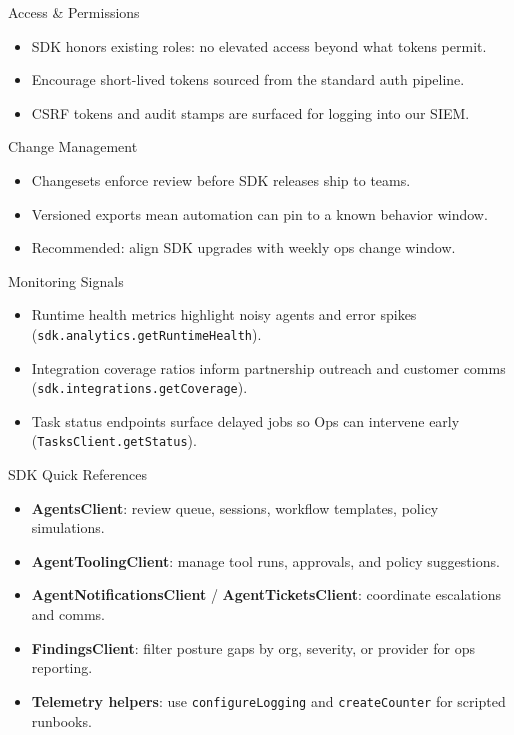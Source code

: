 \documentclass[aspectratio=169]{beamer}
\begin{document}
\begin{frame}{Access \& Permissions}
  \begin{itemize}
    \item SDK honors existing roles: no elevated access beyond what tokens permit.
    \item Encourage short-lived tokens sourced from the standard auth pipeline.
    \item CSRF tokens and audit stamps are surfaced for logging into our SIEM.
  \end{itemize}
\end{frame}

\begin{frame}{Change Management}
  \begin{itemize}
    \item Changesets enforce review before SDK releases ship to teams.
    \item Versioned exports mean automation can pin to a known behavior window.
    \item Recommended: align SDK upgrades with weekly ops change window.
  \end{itemize}
\end{frame}

\begin{frame}{Monitoring Signals}
  \begin{itemize}
    \item Runtime health metrics highlight noisy agents and error spikes (\texttt{sdk.analytics.getRuntimeHealth}).
    \item Integration coverage ratios inform partnership outreach and customer comms (\texttt{sdk.integrations.getCoverage}).
    \item Task status endpoints surface delayed jobs so Ops can intervene early (\texttt{TasksClient.getStatus}).
  \end{itemize}
\end{frame}

\begin{frame}{SDK Quick References}
  \begin{itemize}
    \item \textbf{AgentsClient}: review queue, sessions, workflow templates, policy simulations.
    \item \textbf{AgentToolingClient}: manage tool runs, approvals, and policy suggestions.
    \item \textbf{AgentNotificationsClient} / \textbf{AgentTicketsClient}: coordinate escalations and comms.
    \item \textbf{FindingsClient}: filter posture gaps by org, severity, or provider for ops reporting.
    \item \textbf{Telemetry helpers}: use \texttt{configureLogging} and \texttt{createCounter} for scripted runbooks.
  \end{itemize}
\end{frame}
\end{document}
